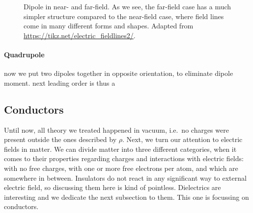 \documentclass[../class_mech_main.tex]{subfiles}
\begin{document}
\begin{figure}
    \centering

    \hspace*{0.2\textwidth}%

    \caption{Dipole in near- and far-field. As we see, the far-field case has a much simpler structure compared to the near-field case, where field lines come in many different forms and shapes. Adapted from \url{https://tikz.net/electric_fieldlines2/}.}
    \label{fig:dipoles}
\end{figure}



            \paragraph{Quadrupole}
now we put two dipoles together in opposite orientation, to eliminate dipole moment. next leading order is thus a 



        \subsection{Conductors}
Until now, all theory we treated happened in vacuum, i.e.~no charges were present outside the ones described by $\rho$. Next, we turn our attention to electric fields in matter. We can divide matter into three different categories, when it comes to their properties regarding charges and interactions with electric fields:  with no free charges,  with one or more free electrons per atom, and  which are somewhere in between. Insulators do not react in any significant way to external electric field, so discussing them here is kind of pointless. Dielectrics are interesting and we dedicate the next subsection to them. This one is focussing on conductors.
\end{document}
